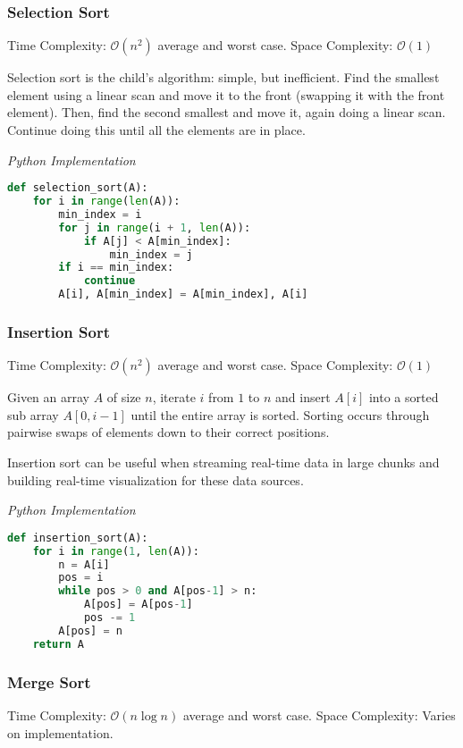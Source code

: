 \documentclass{article}
\newcommand{\bigO}{\mathcal{O}}
\begin{document}
    \subsubsection{Selection Sort}
    Time Complexity: $\bigO(n^2)$ average and worst case. Space Complexity: $\bigO (1)$
    
    Selection sort is the child's algorithm: simple, but inefficient. Find the smallest element using a linear scan and move it to the front (swapping it with the front element). Then, find the second smallest and move it, again doing a linear scan. Continue doing this until all the elements are in place. 

\vspace{8pt} \emph{Python Implementation}
\begin{lstlisting}[language=Python]
def selection_sort(A):
    for i in range(len(A)):
        min_index = i
        for j in range(i + 1, len(A)):
            if A[j] < A[min_index]:
                min_index = j
        if i == min_index:
            continue
        A[i], A[min_index] = A[min_index], A[i]
\end{lstlisting}
    
    \subsubsection{Insertion Sort}
    Time Complexity: $\bigO(n^2)$ average and worst case. Space Complexity: $\bigO(1)$
    
    Given an array $A$ of size $n$, iterate $i$ from $1$ to $n$ and insert $A[i]$ into a sorted sub array $A[0, i-1]$ until the entire array is sorted. Sorting occurs through pairwise swaps of elements down to their correct positions.
    
    Insertion sort can be useful when streaming real-time data in large chunks and building real-time visualization for these data sources.

\vspace{8pt} \emph{Python Implementation}
\begin{lstlisting}[language=Python]
def insertion_sort(A):
    for i in range(1, len(A)):
        n = A[i]
        pos = i
        while pos > 0 and A[pos-1] > n:
            A[pos] = A[pos-1]
            pos -= 1
        A[pos] = n
    return A
\end{lstlisting}

    \subsubsection{Merge Sort}
    Time Complexity: $\bigO( n \log n )$ average and worst case. Space Complexity: Varies on implementation. 
    
\end{document}
